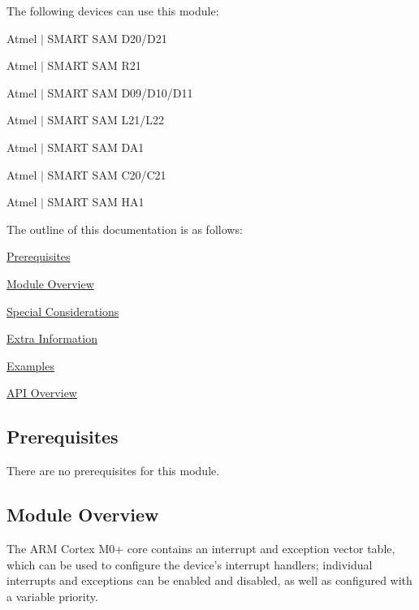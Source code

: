 The following devices can use this module\+:
\begin{DoxyItemize}
\item Atmel $\vert$ S\+M\+A\+R\+T S\+A\+M D20/\+D21
\item Atmel $\vert$ S\+M\+A\+R\+T S\+A\+M R21
\item Atmel $\vert$ S\+M\+A\+R\+T S\+A\+M D09/\+D10/\+D11
\item Atmel $\vert$ S\+M\+A\+R\+T S\+A\+M L21/\+L22
\item Atmel $\vert$ S\+M\+A\+R\+T S\+A\+M D\+A1
\item Atmel $\vert$ S\+M\+A\+R\+T S\+A\+M C20/\+C21
\item Atmel $\vert$ S\+M\+A\+R\+T S\+A\+M H\+A1
\end{DoxyItemize}

The outline of this documentation is as follows\+:
\begin{DoxyItemize}
\item \hyperlink{group__asfdoc__sam0__system__interrupt__group_asfdoc_sam0_system_interrupt_prerequisites}{Prerequisites}
\item \hyperlink{group__asfdoc__sam0__system__interrupt__group_asfdoc_sam0_system_interrupt_module_overview}{Module Overview}
\item \hyperlink{group__asfdoc__sam0__system__interrupt__group_asfdoc_sam0_system_interrupt_special_considerations}{Special Considerations}
\item \hyperlink{group__asfdoc__sam0__system__interrupt__group_asfdoc_sam0_system_interrupt_extra_info}{Extra Information}
\item \hyperlink{group__asfdoc__sam0__system__interrupt__group_asfdoc_sam0_system_interrupt_examples}{Examples}
\item \hyperlink{group__asfdoc__sam0__system__interrupt__group_asfdoc_sam0_system_interrupt_api_overview}{A\+P\+I Overview}
\end{DoxyItemize}\hypertarget{group__asfdoc__sam0__system__interrupt__group_asfdoc_sam0_system_interrupt_prerequisites}{}\subsection{Prerequisites}\label{group__asfdoc__sam0__system__interrupt__group_asfdoc_sam0_system_interrupt_prerequisites}
There are no prerequisites for this module.\hypertarget{group__asfdoc__sam0__system__interrupt__group_asfdoc_sam0_system_interrupt_module_overview}{}\subsection{Module Overview}\label{group__asfdoc__sam0__system__interrupt__group_asfdoc_sam0_system_interrupt_module_overview}
The A\+R\+M\textregistered{} Cortex\textregistered{} M0+ core contains an interrupt and exception vector table, which can be used to configure the device's interrupt handlers; individual interrupts and exceptions can be enabled and disabled, as well as configured with a variable priority.

